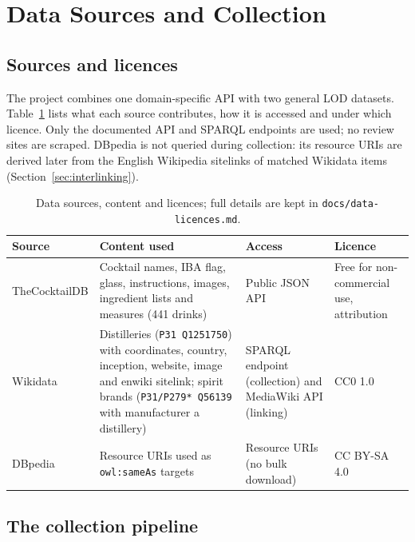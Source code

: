 \section{Data Sources and Collection}
\label{sec:data}

\subsection{Sources and licences}

The project combines one domain-specific API with two general LOD datasets.
Table~\ref{tab:sources} lists what each source contributes, how it is accessed
and under which licence. Only the documented API and SPARQL endpoints are used;
no review sites are scraped. DBpedia is not queried during collection: its
resource URIs are derived later from the English Wikipedia sitelinks of matched
Wikidata items (Section~\ref{sec:interlinking}).

\begin{table}[h]
  \centering
  \small
  \begin{tabular}{@{}p{2.5cm}p{5.6cm}p{2.6cm}p{3.3cm}@{}}
    \toprule
    Source & Content used & Access & Licence \\
    \midrule
    TheCocktailDB \cite{cocktaildb} & Cocktail names, IBA flag, glass,
    instructions, images, ingredient lists and measures (441 drinks) & Public
    JSON API & Free for non-commercial use, attribution \\
    Wikidata \cite{wikidata} & Distilleries (\texttt{P31 Q1251750}) with
    coordinates, country, inception, website, image and enwiki sitelink;
    spirit brands (\texttt{P31/P279* Q56139} with manufacturer a distillery)
    & SPARQL endpoint (collection) and MediaWiki API (linking) & CC0 1.0 \\
    DBpedia \cite{dbpedia} & Resource URIs used as \texttt{owl:sameAs} targets
    & Resource URIs (no bulk download) & CC BY-SA 4.0 \\
    \bottomrule
  \end{tabular}
  \caption{Data sources, content and licences; full details are kept in
  \texttt{docs/data-licences.md}.}
  \label{tab:sources}
\end{table}

\subsection{The collection pipeline}

